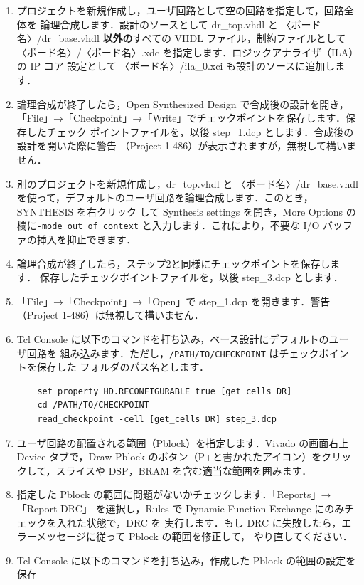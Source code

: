 \begin{enumerate}
 \item プロジェクトを新規作成し，ユーザ回路として空の回路を指定して，回路全体を
 論理合成します．設計のソースとして dr\_top.vhdl と 〈ボード名〉/dr\_base.vhdl
 \textbf{以外の}すべての VHDL ファイル，制約ファイルとして
 〈ボード名〉/〈ボード名〉.xdc を指定します．ロジックアナライザ（ILA）の IP コア
 設定として 〈ボード名〉/ila\_0.xci も設計のソースに追加します．
 \item 論理合成が終了したら，Open Synthesized Design で合成後の設計を開き，
 「File」→「Checkpoint」→「Write」でチェックポイントを保存します．保存したチェック
 ポイントファイルを，以後 step\_1.dcp とします．合成後の設計を開いた際に警告
 （Project 1-486）が表示されますが，無視して構いません．
 \item 別のプロジェクトを新規作成し，dr\_top.vhdl と 〈ボード名〉/dr\_base.vhdl
 を使って，デフォルトのユーザ回路を論理合成します．このとき，SYNTHESIS を右クリック
 して Synthesis settings を開き，More Options の欄に\texttt{-mode out\_of\_context}
 と入力します．これにより，不要な I/O バッファの挿入を抑止できます．
 \item 論理合成が終了したら，ステップ2と同様にチェックポイントを保存します．
 保存したチェックポイントファイルを，以後 step\_3.dcp とします．
 \item 「File」→「Checkpoint」→「Open」で step\_1.dcp を開きます．警告
 （Project 1-486）は無視して構いません．
 \item Tcl Console に以下のコマンドを打ち込み，ベース設計にデフォルトのユーザ回路を
 組み込みます．ただし，\texttt{/PATH/TO/CHECKPOINT} はチェックポイントを保存した
 フォルダのパス名とします．
\begin{verbatim}
    set_property HD.RECONFIGURABLE true [get_cells DR]
    cd /PATH/TO/CHECKPOINT
    read_checkpoint -cell [get_cells DR] step_3.dcp
\end{verbatim}
 \item ユーザ回路の配置される範囲（Pblock）を指定します．Vivado の画面右上 Device
 タブで，Draw Pblock のボタン（P+と書かれたアイコン）をクリックして，スライスや
 DSP，BRAM を含む適当な範囲を囲みます．
 \item 指定した Pblock の範囲に問題がないかチェックします．「Reports」→「Report DRC」
 を選択し，Rules で Dynamic Function Exchange にのみチェックを入れた状態で，DRC を
 実行します．もし DRC に失敗したら，エラーメッセージに従って Pblock の範囲を修正して，
 やり直してください．
 \item Tcl Console に以下のコマンドを打ち込み，作成した Pblock の範囲の設定を保存

\end{enumerate}
